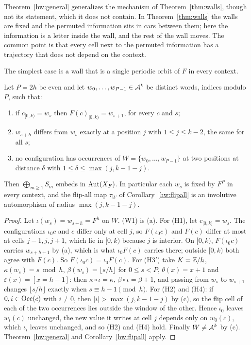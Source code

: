 Theorem~\ref{hw:general} generalizes the mechanism of Theorem~\ref{thm:walls}, though not its statement, which it does not contain. In Theorem~\ref{thm:walls} the walls are fixed and the permuted information sits in cars between them; here the information is a letter inside the wall, and the rest of the wall moves. The common point is that every cell next to the permuted information has a trajectory that does not depend on the context.

The simplest case is a wall that is a single periodic orbit of $F$ in every context.

\begin{corollary}\label{hw:periodic}
Let $P=2h$ be even and let $w_0,\dots,w_{P-1}\in\mathcal{A}^k$ be distinct words, indices modulo $P$, such that:
\begin{enumerate}
\item[(a)] if $c_{[0,k)}=w_s$ then $F(c)_{[0,k)}=w_{s+1}$, for every $c$ and $s$;
\item[(b)] $w_{s+h}$ differs from $w_s$ exactly at a position $j$ with $1\le j\le k-2$, the same for all $s$;
\item[(c)] no configuration has occurrences of $W=\{w_0,\dots,w_{P-1}\}$ at two positions at distance $\delta$ with $1\le\delta\le\max(j,k-1-j)$.
\end{enumerate}
Then $\bigoplus_{m\ge1}S_m$ embeds in $\operatorname{Aut}(X_F)$. In particular each $w_s$ is fixed by $F^P$ in every context, and the flip-all map $\tau_W$ of Corollary~\ref{hw:flipall} is an involutive automorphism of radius $\max(j,k-1-j)$.
\end{corollary}

\begin{proof}
Let $\iota(w_s)=w_{s+h}=F^h$ on $W$. (W1) is (a). For (H1), let $c_{[0,k)}=w_s$. The configurations $\iota_0c$ and $c$ differ only at cell $j$, so $F(\iota_0c)$ and $F(c)$ differ at most at cells $j-1,j,j+1$, which lie in $[0,k)$ because $j$ is interior. On $[0,k)$, $F(\iota_0c)$ carries $w_{s+h+1}$ by (a), which is what $\iota_0F(c)$ carries there; outside $[0,k)$ both agree with $F(c)$. So $F(\iota_0c)=\iota_0F(c)$. For (H3$'$) take $K=\mathbb{Z}/h$, $\kappa(w_s)=s\bmod h$, $\beta(w_s)=\lfloor s/h\rfloor$ for $0\le s<P$, $\theta(x)=x+1$ and $\varepsilon(x)=[x=h-1]$: then $\kappa\circ\iota=\kappa$, $\beta\circ\iota=\beta+1$, and passing from $w_s$ to $w_{s+1}$ changes $\lfloor s/h\rfloor$ exactly when $s\equiv h-1\pmod h$. For (H2) and (H4): if $0,i\in\operatorname{Occ}(c)$ with $i\ne0$, then $|i|>\max(j,k-1-j)$ by (c), so the flip cell of each of the two occurrences lies outside the window of the other. Hence $\iota_0$ leaves $w_i(c)$ unchanged, the new value it writes at cell $j$ depends only on $w_0(c)$, which $\iota_i$ leaves unchanged, and so (H2) and (H4) hold. Finally $W\ne\mathcal{A}^k$ by (c). Theorem~\ref{hw:general} and Corollary~\ref{hw:flipall} apply.
\end{proof}

